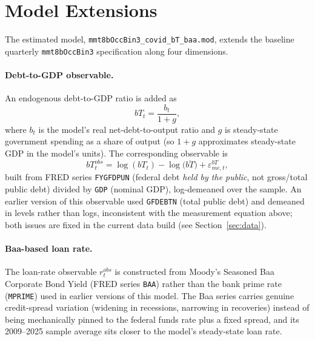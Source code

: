 \documentclass[11pt]{article}
\begin{document}
\begin{abstract}
\textbf{This revision reports a further re-estimation round} on top of
the above, prompted by two changes: (i) a corrected household
budget-constraint identity for reserves $n_t$, which previously used a
fixed steady-state placeholder for the debt terms rather than the
genuine (lagged and current) debt state, and (ii) substantially less
informative priors on the Taylor-rule policy-response coefficients
$b_\pi$ and $b_y$ (Gamma(1.00, 1.00) and Gamma(1.00, 0.70), replacing a
tight Normal(2.10, 0.15) and Gamma(0.28, 0.10) respectively) together
with a lower prior mean for the fiscal-feedback parameter $\varphi_b$
(0.05, from 0.10), so that the posterior on the inflation-response
coefficient in particular reflects what the data support rather than a
tight prior. All posterior, convergence, determinacy, and steady-state
results reported below are from this latest round; the tuning history
of the earlier (tight-prior) round is retained for context.
\end{abstract}

\section{Model Extensions}

The estimated model, \texttt{mmt8bOccBin3\_covid\_bT\_baa.mod}, extends
the baseline quarterly \texttt{mmt8bOccBin3} specification along four
dimensions.

\paragraph{Debt-to-GDP observable.} An endogenous debt-to-GDP ratio is
added as
\[
bT_t = \frac{b_t}{1+g},
\]
where $b_t$ is the model's real net-debt-to-output ratio and $g$ is
steady-state government spending as a share of output (so $1+g$
approximates steady-state GDP in the model's units). The corresponding
observable is
\[
bT^{obs}_t = \log(bT_t) - \log\!\big(\overline{bT}\big) + \varepsilon^{bT}_{me,t},
\]
built from FRED series \texttt{FYGFDPUN} (federal debt \emph{held by the
public}, not gross/total public debt) divided by \texttt{GDP} (nominal
GDP), log-demeaned over the sample. An earlier version of this
observable used \texttt{GFDEBTN} (total public debt) and demeaned in
levels rather than logs, inconsistent with the measurement equation
above; both issues are fixed in the current data build (see
Section~\ref{sec:data}).

\paragraph{Baa-based loan rate.} The loan-rate observable $r^{obs}_t$ is
constructed from Moody's Seasoned Baa Corporate Bond Yield (FRED series
\texttt{BAA}) rather than the bank prime rate (\texttt{MPRIME}) used in
earlier versions of this model. The Baa series carries genuine
credit-spread variation (widening in recessions, narrowing in
recoveries) instead of being mechanically pinned to the federal funds
rate plus a fixed spread, and its 2009--2025 sample average sits closer
to the model's steady-state loan rate.
\end{document}

